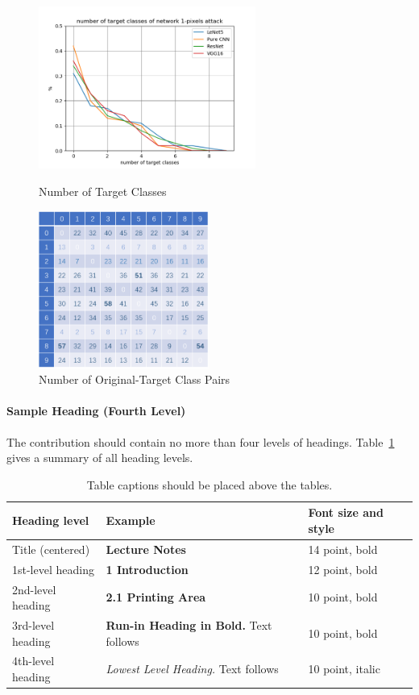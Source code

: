 \documentclass[runningheads]{llncs}
\begin{document}
\begin{figure}[h]
	\begin{minipage}[t]{0.5\textwidth}
		\includegraphics[width=2.8in]{figures/result3.png}
		\caption{Number of Target Classes} \label{result3}
	\end{minipage}
	\qquad
	\begin{minipage}[t]{0.5\textwidth}
		\includegraphics[width=2.2in]{figures/result4.png}
		\caption{Number of Original-Target Class Pairs} \label{result4}
	\end{minipage}
\end{figure}


\paragraph{Sample Heading (Fourth Level)}
The contribution should contain no more than four levels of
headings. Table~\ref{tab1} gives a summary of all heading levels.

\begin{table}
\caption{Table captions should be placed above the
tables.}\label{tab1}
\begin{tabular}{|l|l|l|}
\hline
Heading level &  Example & Font size and style\\
\hline
Title (centered) &  {\Large\bfseries Lecture Notes} & 14 point, bold\\
1st-level heading &  {\large\bfseries 1 Introduction} & 12 point, bold\\
2nd-level heading & {\bfseries 2.1 Printing Area} & 10 point, bold\\
3rd-level heading & {\bfseries Run-in Heading in Bold.} Text follows & 10 point, bold\\
4th-level heading & {\itshape Lowest Level Heading.} Text follows & 10 point, italic\\
\hline
\end{tabular}
\end{table}
\end{document}
